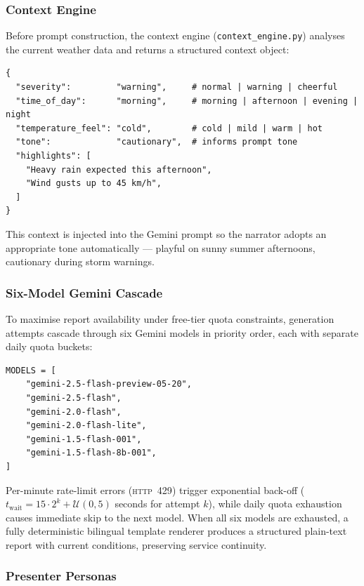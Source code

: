 \documentclass[11pt, a4paper]{article}
\begin{document}
\subsubsection{Context Engine}

Before prompt construction, the context engine (\texttt{context\_engine.py}) analyses the
current weather data and returns a structured context object:

\begin{lstlisting}[style=pythonstyle, caption={Context engine output structure.}]
{
  "severity":         "warning",     # normal | warning | cheerful
  "time_of_day":      "morning",     # morning | afternoon | evening | night
  "temperature_feel": "cold",        # cold | mild | warm | hot
  "tone":             "cautionary",  # informs prompt tone
  "highlights": [
    "Heavy rain expected this afternoon",
    "Wind gusts up to 45 km/h",
  ]
}
\end{lstlisting}

This context is injected into the Gemini prompt so the narrator adopts an appropriate
tone automatically — playful on sunny summer afternoons, cautionary during storm warnings.

\subsubsection{Six-Model Gemini Cascade}

To maximise report availability under free-tier quota constraints, generation attempts
cascade through six Gemini models in priority order, each with separate daily quota buckets:

\begin{lstlisting}[style=pythonstyle, caption={Model priority list in \texttt{text\_generation.py}.}]
MODELS = [
    "gemini-2.5-flash-preview-05-20",
    "gemini-2.5-flash",
    "gemini-2.0-flash",
    "gemini-2.0-flash-lite",
    "gemini-1.5-flash-001",
    "gemini-1.5-flash-8b-001",
]
\end{lstlisting}

Per-minute rate-limit errors (\textsc{http~429}) trigger exponential back-off
($t_{\text{wait}} = 15 \cdot 2^{k} + \mathcal{U}(0, 5)$ seconds for attempt $k$),
while daily quota exhaustion causes immediate skip to the next model. When all six models
are exhausted, a fully deterministic bilingual template renderer produces a structured
plain-text report with current conditions, preserving service continuity.

\subsubsection{Presenter Personas}
\end{document}
